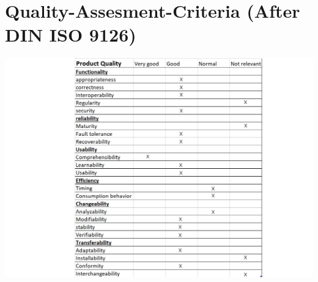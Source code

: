 \section{Quality-Assesment-Criteria (After DIN ISO 9126)}
\includegraphics[width = \textwidth]{charts/Product_Quality_Table.png}
